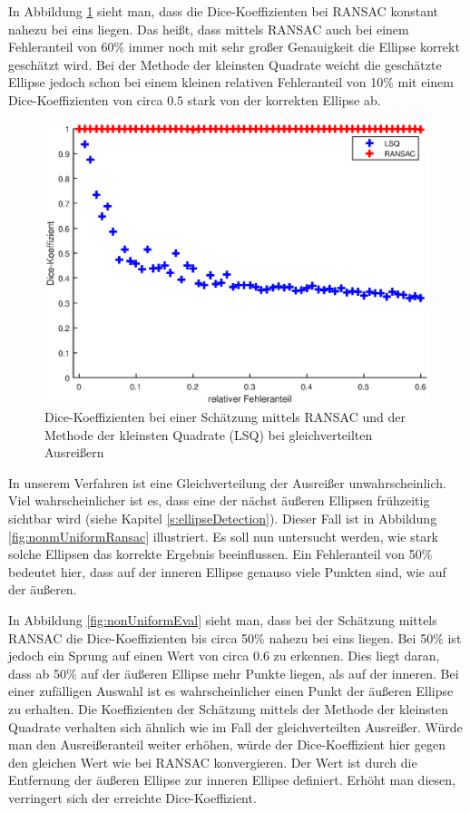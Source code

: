 {In Abbildung \ref{fig:uniformEval} sieht man, dass die Dice-Koeffizienten bei RANSAC konstant nahezu bei eins liegen. Das heißt, dass mittels RANSAC auch bei einem Fehleranteil von 60\% immer noch mit sehr großer Genauigkeit die Ellipse korrekt geschätzt wird. Bei der Methode der kleinsten Quadrate weicht die geschätzte Ellipse jedoch schon bei einem kleinen relativen Fehleranteil von 10\% mit einem Dice-Koeffizienten von circa $0.5$ stark von der korrekten Ellipse ab.


\begin{figure}[!htb]
	\centering
	\includegraphics[width=\textwidth]{images/ransacEval0.eps}
	\caption{Dice-Koeffizienten bei einer Schätzung mittels RANSAC und der Methode der kleinsten Quadrate (LSQ) bei gleichverteilten Ausreißern}
	\label{fig:uniformEval}
\end{figure}

In unserem Verfahren ist eine Gleichverteilung der Ausreißer unwahrscheinlich. Viel wahrscheinlicher ist es, dass eine der nächst äußeren Ellipsen frühzeitig sichtbar wird (siehe Kapitel \ref{s:ellipseDetection}).
Dieser Fall ist in Abbildung \ref{fig:nonmUniformRansac} illustriert. Es soll nun untersucht werden, wie stark solche Ellipsen das korrekte Ergebnis beeinflussen. 
Ein Fehleranteil von 50\% bedeutet hier, dass auf der inneren Ellipse genauso viele Punkten sind, wie auf der äußeren.

In Abbildung \ref{fig:nonUniformEval} sieht man, dass bei der Schätzung mittels RANSAC die Dice-Koeffizienten bis circa 50\% nahezu bei eins liegen. Bei 50\% ist jedoch ein Sprung auf einen Wert von circa $0.6$ zu erkennen. Dies liegt daran, dass ab 50\% auf der äußeren Ellipse mehr Punkte liegen, als auf der inneren. Bei einer zufälligen Auswahl ist es wahrscheinlicher einen Punkt der äußeren Ellipse zu erhalten. Die Koeffizienten der Schätzung mittels der Methode der kleinsten Quadrate verhalten sich ähnlich wie im Fall der gleichverteilten Ausreißer. Würde man den Ausreißeranteil weiter erhöhen, würde der Dice-Koeffizient hier gegen den gleichen Wert wie bei RANSAC konvergieren. Der Wert ist durch die Entfernung der äußeren Ellipse zur inneren Ellipse definiert. Erhöht man diesen, verringert sich der erreichte Dice-Koeffizient.

}
